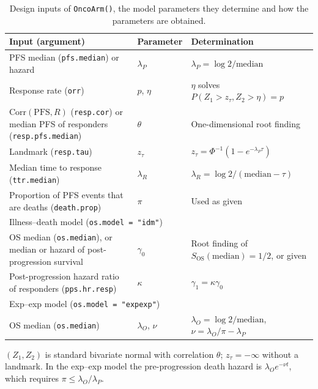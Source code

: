 \begin{table}[htbp]
\centering
\caption{Design inputs of \texttt{OncoArm()}, the model parameters they determine and how the parameters are obtained.}
\label{tab:inputs}
\begin{threeparttable}
\footnotesize
\begin{tabular}{p{5.2cm}p{1.6cm}p{5.4cm}}
\toprule
Input (argument) & Parameter & Determination \\
\midrule
PFS median (\texttt{pfs.median}) or hazard & $\lambda_P$ & $\lambda_P = \log 2 / \mathrm{median}$ \\
Response rate (\texttt{orr}) & $p$, $\eta$ & $\eta$ solves $P(Z_1 > z_\tau, Z_2 > \eta) = p$ \\
$\mathrm{Corr}(\mathrm{PFS}, R)$ (\texttt{resp.cor}) or median PFS of responders (\texttt{resp.pfs.median}) & $\theta$ & One-dimensional root finding \\
Landmark (\texttt{resp.tau}) & $z_\tau$ & $z_\tau = \Phi^{-1}(1 - e^{-\lambda_P \tau})$ \\
Median time to response (\texttt{ttr.median}) & $\lambda_R$ & $\lambda_R = \log 2 / (\mathrm{median} - \tau)$ \\
Proportion of PFS events that are deaths (\texttt{death.prop}) & $\pi$ & Used as given \\
\midrule
\multicolumn{3}{l}{Illness--death model (\texttt{os.model = "idm"})} \\
OS median (\texttt{os.median}), or median or hazard of post-progression survival & $\gamma_0$ & Root finding of $S_{\mathrm{OS}}(\mathrm{median}) = 1/2$, or given \\
Post-progression hazard ratio of responders (\texttt{pps.hr.resp}) & $\kappa$ & $\gamma_1 = \kappa \gamma_0$ \\
\midrule
\multicolumn{3}{l}{Exp--exp model (\texttt{os.model = "expexp"})} \\
OS median (\texttt{os.median}) & $\lambda_O$, $\nu$ & $\lambda_O = \log 2 / \mathrm{median}$, $\nu = \lambda_O / \pi - \lambda_P$ \\
\bottomrule
\end{tabular}
\begin{tablenotes}
\footnotesize
\item $(Z_1, Z_2)$ is standard bivariate normal with correlation $\theta$; $z_\tau = -\infty$ without a landmark. In the exp--exp model the pre-progression death hazard is $\lambda_O e^{-\nu t}$, which requires $\pi \le \lambda_O / \lambda_P$.
\end{tablenotes}
\end{threeparttable}
\end{table}
